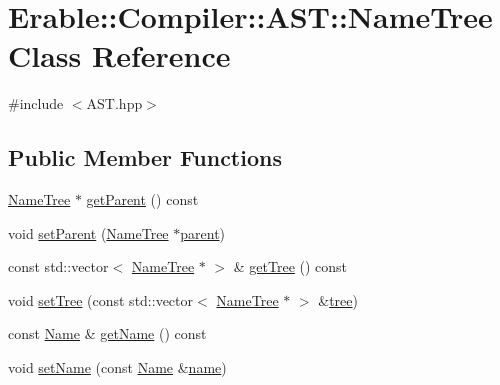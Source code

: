 \hypertarget{class_erable_1_1_compiler_1_1_a_s_t_1_1_name_tree}{}\section{Erable\+::Compiler\+::A\+ST\+::Name\+Tree Class Reference}
\label{class_erable_1_1_compiler_1_1_a_s_t_1_1_name_tree}


{\ttfamily \#include $<$A\+S\+T.\+hpp$>$}

\subsection*{Public Member Functions}
\begin{DoxyCompactItemize}
\item 
\mbox{\hyperlink{class_erable_1_1_compiler_1_1_a_s_t_1_1_name_tree}{Name\+Tree}} $\ast$ \mbox{\hyperlink{class_erable_1_1_compiler_1_1_a_s_t_1_1_name_tree_ad9ce70505b2114f933d57b537ea7acbb}{get\+Parent}} () const
\item 
void \mbox{\hyperlink{class_erable_1_1_compiler_1_1_a_s_t_1_1_name_tree_a36a0a7bb3edac16e2471151e5faa95d7}{set\+Parent}} (\mbox{\hyperlink{class_erable_1_1_compiler_1_1_a_s_t_1_1_name_tree}{Name\+Tree}} $\ast$\mbox{\hyperlink{class_erable_1_1_compiler_1_1_a_s_t_1_1_name_tree_a9f06bae060fbc5d1caf3ff5217efe1d7}{parent}})
\item 
const std\+::vector$<$ \mbox{\hyperlink{class_erable_1_1_compiler_1_1_a_s_t_1_1_name_tree}{Name\+Tree}} $\ast$ $>$ \& \mbox{\hyperlink{class_erable_1_1_compiler_1_1_a_s_t_1_1_name_tree_a8d26f365141a7adc854a271717ba6710}{get\+Tree}} () const
\item 
void \mbox{\hyperlink{class_erable_1_1_compiler_1_1_a_s_t_1_1_name_tree_af3af2c80aafa7e4765ceecb2784ca29e}{set\+Tree}} (const std\+::vector$<$ \mbox{\hyperlink{class_erable_1_1_compiler_1_1_a_s_t_1_1_name_tree}{Name\+Tree}} $\ast$ $>$ \&\mbox{\hyperlink{class_erable_1_1_compiler_1_1_a_s_t_1_1_name_tree_aa5535b40b2cac012da11e76e99450959}{tree}})
\item 
const \mbox{\hyperlink{class_erable_1_1_compiler_1_1_a_s_t_1_1_name}{Name}} \& \mbox{\hyperlink{class_erable_1_1_compiler_1_1_a_s_t_1_1_name_tree_a832e694eadd8449b8e97e86a1d3fac71}{get\+Name}} () const
\item 
void \mbox{\hyperlink{class_erable_1_1_compiler_1_1_a_s_t_1_1_name_tree_a11aa9eb32dad2b06f21aea9dcca644c7}{set\+Name}} (const \mbox{\hyperlink{class_erable_1_1_compiler_1_1_a_s_t_1_1_name}{Name}} \&\mbox{\hyperlink{class_erable_1_1_compiler_1_1_a_s_t_1_1_name_tree_aff22e85f6bc0c00445af8dd19d851688}{name}})

\end{DoxyCompactItemize}
